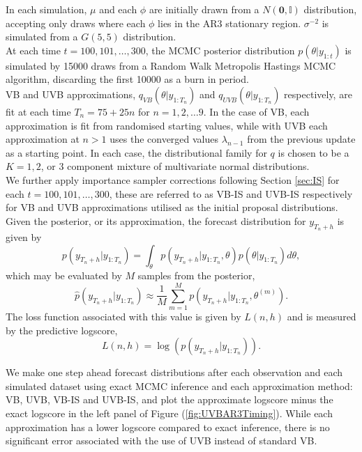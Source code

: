 \documentclass[12pt,a4paper]{article}\usepackage[]{graphicx}\usepackage[]{color}
\begin{document}
In each simulation, $\mu$ and each $\phi$ are initially drawn from a $N(\boldsymbol{0}, \mathbb{I})$ distribution, accepting only draws where each $\phi$ lies in the AR3 stationary region. $\sigma^{-2}$ is simulated from a $G(5, 5)$ distribution.
\\

At each time $t = 100, 101, \ldots, 300$, the MCMC posterior distribution $p(\theta | y_{1:t})$ is simulated by 15000 draws from a Random Walk Metropolis Hastings MCMC algorithm, discarding the first 10000 as a burn in period.
\\

VB and UVB approximations, $q_{VB}(\theta | y_{1:T_n})$ and $q_{UVB}(\theta | y_{1:T_n})$ respectively, are fit at each time $T_n = 75 + 25n$ for $n = 1, 2, \ldots 9$. In the case of VB, each approximation is fit from randomised starting values, while with UVB each approximation at $n > 1$ uses the converged values $\lambda_{n-1}$ from the previous update as a starting point. In each case, the distributional family for $q$ is chosen to be a $K = 1, 2$, or $3$ component mixture of multivariate normal distributions.
\\

We further apply importance sampler corrections following Section \ref{sec:IS} for each $t = 100, 101, \ldots, 300$, these are referred to as VB-IS and UVB-IS respectively for VB and UVB approximations utilised as the initial proposal distributions.
\\

Given the posterior, or its approximation, the forecast distribution for $y_{T_n+h}$ is given by
\begin{equation}
\label{UVB:TSforecastDist}
p(y_{T_n + h} | y_{1:T_n}) = \int_{\theta} p(y_{T_n + h} | y_{1:T_n}, \theta)p(\theta | y_{1:T_n})d\theta,
\end{equation}
which may be evaluated by $M$ samples from the posterior,
\begin{equation}
\label{UVB:TSforecastDistApprox}
\hat{p}(y_{T_n + h} | y_{1:T_n}) \approx \frac{1}{M} \sum_{m=1}^M  p(y_{T_n + h} | y_{1:T_n}, \theta^{(m)}).
\end{equation}
The loss function associated with this value is given by $L(n, h)$ and is measured by the predictive logscore,
\begin{equation}
\label{UVB:TSlogscore}
L(n, h) = \log(p(y_{T_n + h} | y_{1:T_n})).
\end{equation}

We make one step ahead forecast distributions after each observation and each simulated dataset using exact MCMC inference and each approximation method: VB, UVB, VB-IS and UVB-IS, and plot the approximate logscore minus the exact logscore in the left panel of Figure (\ref{fig:UVBAR3Timing}). While each approximation has a lower logscore compared to exact inference, there is no significant error associated with the use of UVB instead of standard VB.
\\
\end{document}
